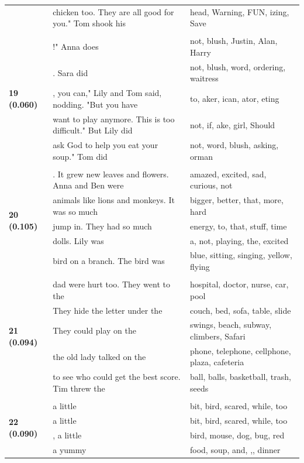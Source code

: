 \documentclass{article}
\theoremstyle{plain}
\theoremstyle{definition}
\theoremstyle{remark}
\begin{document}
\begin{longtable}{|p{}|p{}|p{}|}
& chicken too. They are all good for you."  Tom shook his & head,  Warning,  FUN, izing, Save \\
& & \\
\multirow{5}{*}{\textbf{19 (0.060)}} & !"  Anna does & not,  blush,  Justin,  Alan,  Harry \\
& .  Sara did & not,  blush,  word,  ordering,  waitress \\
& , you can," Lily and Tom said, nodding. "But you have & to, aker, ican, ator, eting \\
& want to play anymore. This is too difficult." But Lily did & not,  if, ake,  girl,  Should \\
& ask God to help you eat your soup."  Tom did & not,  word,  blush,  asking, orman \\
& & \\
\multirow{5}{*}{\textbf{20 (0.105)}} & . It grew new leaves and flowers. Anna and Ben were & amazed,  excited,  sad,  curious,  not \\
& animals like lions and monkeys. It was so much & bigger,  better,  that,  more,  hard \\
& jump in. They had so much & energy,  to,  that,  stuff,  time \\
& dolls. Lily was & a,  not,  playing,  the,  excited \\
& bird on a branch. The bird was & blue,  sitting,  singing,  yellow,  flying \\
& & \\
\multirow{5}{*}{\textbf{21 (0.094)}} & dad were hurt too. They went to the & hospital,  doctor,  nurse,  car,  pool \\
& They hide the letter under the & couch,  bed,  sofa,  table,  slide \\
& They could play on the & swings,  beach,  subway,  climbers,  Safari \\
& the old lady talked on the & phone,  telephone,  cellphone,  plaza,  cafeteria \\
& to see who could get the best score.  Tim threw the & ball,  balls,  basketball,  trash,  seeds \\
& & \\
\multirow{5}{*}{\textbf{22 (0.090)}} & a little & bit,  bird,  scared,  while,  too \\
& a little & bit,  bird,  scared,  while,  too \\
& , a little & bird,  mouse,  dog,  bug,  red \\
& a yummy & food,  soup,  and, ,,  dinner \\

\end{longtable}
\end{document}
